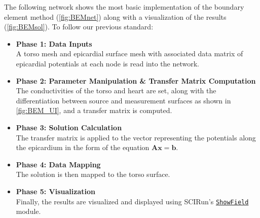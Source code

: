 The following network shows the most basic implementation of the boundary element method (\autoref{fig:BEMnet})
along with a visualization of the results (\autoref{fig:BEMsol}). To follow our previous standard:
\begin{itemize}
\item {\bf Phase 1: Data Inputs} \\
A torso mesh and epicardial surface mesh with associated data matrix of epicardial potentials at each node is read into the network.
\item {\bf Phase 2: Parameter Manipulation \& Transfer Matrix Computation} \\
The conductivities of the torso and heart are set, along with the differentiation between source and measurement surfaces as shown in \autoref{fig:BEM_UI}, and a transfer matrix is computed.
\item {\bf Phase 3: Solution Calculation} \\
The transfer matrix is applied to the vector representing the potentials along the epicardium in the form of the equation $\mathbf{Ax = b}$.
\item {\bf Phase 4: Data Mapping} \\
The solution is then mapped to the torso surface.
\item {\bf Phase 5: Visualization} \\
Finally, the results are visualized and displayed using SCIRun's \href{http://sciinstitute.github.io/scirun.pages/modules.html#ShowField}{\tt ShowField} module.
\end{itemize}



\newpage

